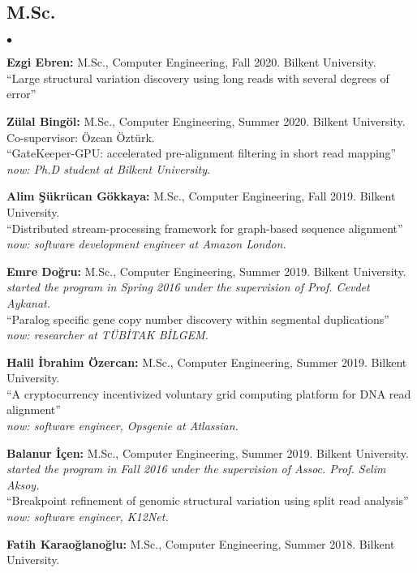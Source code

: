\documentclass[margin,line]{res}
\newenvironment{list2}{
  \begin{list}{$\bullet$}{%
      \setlength{\itemsep}{0.1cm}
      \setlength{\parsep}{0in} \setlength{\parskip}{0in}
      \setlength{\topsep}{0in} \setlength{\partopsep}{0in} 
      \setlength{\leftmargin}{0.2in}}}{\end{list}}
\begin{document}
\begin{resume}
\subsection{\small \sc M.Sc.}
\begin{list2}
\item
  {\bf Ezgi Ebren:} M.Sc., Computer Engineering, Fall 2020. Bilkent University. \\
  ``Large structural variation discovery using long reads with several degrees of error''
\item
  {\bf Zülal Bingöl:} M.Sc., Computer Engineering, Summer 2020. Bilkent University. Co-supervisor: Özcan Öztürk.\\
  ``GateKeeper-GPU: accelerated pre-alignment filtering in short read mapping''\\
  {\it now: Ph.D student at Bilkent University}.
\item
  {\bf Alim Şükrücan Gökkaya:} M.Sc., Computer Engineering, Fall 2019.
  Bilkent University. \\
  ``Distributed stream-processing framework for graph-based sequence alignment''\\
  {\it now: software development engineer at Amazon London.}
\item
  {\bf Emre Doğru:} M.Sc., Computer Engineering, Summer 2019.
  Bilkent University. {\it started the program in Spring 2016 under the supervision of Prof. Cevdet Aykanat.}\\
  ``Paralog specific gene copy number discovery within segmental duplications''\\
  {\it now: researcher at TÜBİTAK BİLGEM.}
\item
  {\bf Halil İbrahim Özercan:} M.Sc., Computer Engineering, Summer 2019.
  Bilkent University. \\
  ``A cryptocurrency incentivized voluntary grid computing platform for DNA read alignment''\\
  {\it now: software engineer, Opsgenie at Atlassian.}
\item
  {\bf Balanur İçen:} M.Sc., Computer Engineering, Summer 2019.
  Bilkent University. {\it started the program in Fall 2016 under the supervision of Assoc. Prof. Selim Aksoy.}\\
  ``Breakpoint refinement of genomic structural variation using split read analysis'' \\
  {\it now: software engineer, K12Net.}
\item
  {\bf Fatih Karaoğlanoğlu:} M.Sc., Computer Engineering, Summer 2018.
  Bilkent University. \\

\end{list2}
\end{resume}
\end{document}
